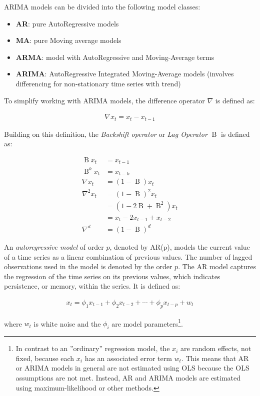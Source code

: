 ARIMA models can be divided into the following model classes:
\begin{itemize}
  \item \textbf{AR}: pure AutoRegressive models
  \item \textbf{MA}: pure Moving average models
  \item \textbf{ARMA}: model with AutoRegressive and Moving-Average terms
  \item \textbf{ARIMA}: AutoRegressive Integrated Moving-Average models (involves differencing for non-stationary time series with trend)
\end{itemize}

To simplify working with ARIMA models, the difference operator $\nabla$ is defined as:

\begin{align*}\nabla x_t = x_t - x_{t-1}\end{align*}

\noindent Building on this definition, the \emph{Backshift operator} or \emph{Lag Operator} $\operatorname{B}$ is defined as:

\begin{align*}\operatorname{B} x_t &= x_{t-1} \\
\operatorname{B}^k x_t &= x_{t-k} \\
\nabla x_t &= (1-\operatorname{B})x_t \\
\nabla^2 x_t &= (1-\operatorname{B})^2 x_t \\
 &= (1-2 \operatorname{B} + \operatorname{B}^2)x_t \\
 &= x_t - 2x_{t-1} + x_{t-2} \\
\nabla^d &= (1-\operatorname{B})^d
\end{align*}

An \emph{autoregressive model} of order $p$, denoted by AR(p), models the current value of a time series as a linear combination of previous values. The number of lagged observations used in the model is denoted by the order $p$. The AR model captures the regression of the time series on its previous values, which indicates persistence, or memory, within the series. It is defined as:

\begin{align*}
x_t = \phi_1 x_{t-1} + \phi_2 x_{t-2} + \cdots + \phi_p x_{t-p} + w_t
\end{align*}

\noindent where $w_t$ is white noise and the $\phi_i$ are model parameters\footnote{In contrast to an ''ordinary'' regression model, the $x_i$ are random effects, not fixed, because each $x_i$ has an associated error term $w_t$. This means that AR or ARIMA models in general are not estimated using OLS because the OLS assumptions are not met. Instead, AR and ARIMA models are estimated using maximum-likelihood or other methods.}.


